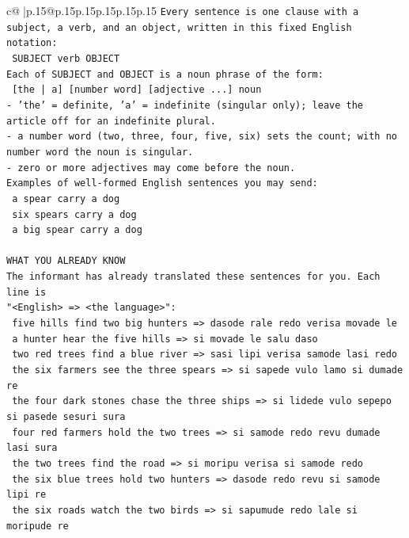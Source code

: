 \documentclass{article}
\begin{document}
{\begin{supertabular}{c@{$\;$}|p{.15\linewidth}@{}p{.15\linewidth}p{.15\linewidth}p{.15\linewidth}p{.15\linewidth}p{.15\linewidth}}
{{{\texttt{Every sentence is one clause with a subject, a verb, and an object, written in this fixed English notation:} \\
\texttt{    SUBJECT  verb  OBJECT} \\
\texttt{Each of SUBJECT and OBJECT is a noun phrase of the form:} \\
\texttt{    {[}the | a{]}  {[}number word{]}  {[}adjective ...{]}  noun} \\
\texttt{{-} 'the' = definite, 'a' = indefinite (singular only); leave the article off for an indefinite plural.} \\
\texttt{{-} a number word (two, three, four, five, six) sets the count; with no number word the noun is singular.} \\
\texttt{{-} zero or more adjectives may come before the noun.} \\
\texttt{Examples of well{-}formed English sentences you may send:} \\
\texttt{    a spear carry a dog} \\
\texttt{    six spears carry a dog} \\
\texttt{    a big spear carry a dog} \\
\\ 
\texttt{WHAT YOU ALREADY KNOW} \\
\texttt{The informant has already translated these sentences for you. Each line is} \\
\texttt{"<English>  =>  <the language>":} \\
\texttt{    five hills find two big hunters  =>  dasode rale redo verisa movade le} \\
\texttt{    a hunter hear the five hills  =>  si movade le salu daso} \\
\texttt{    two red trees find a blue river  =>  sasi lipi verisa samode lasi redo} \\
\texttt{    the six farmers see the three spears  =>  si sapede vulo lamo si dumade re} \\
\texttt{    the four dark stones chase the three ships  =>  si lidede vulo sepepo si pasede sesuri sura} \\
\texttt{    four red farmers hold the two trees  =>  si samode redo revu dumade lasi sura} \\
\texttt{    the two trees find the road  =>  si moripu verisa si samode redo} \\
\texttt{    the six blue trees hold two hunters  =>  dasode redo revu si samode lipi re} \\
\texttt{    the six roads watch the two birds  =>  si sapumude redo lale si moripude re} \\
}}}
\end{supertabular}}
\end{document}

